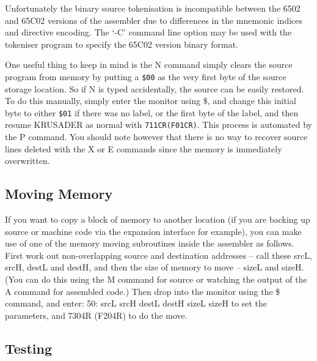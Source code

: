 \documentclass[12pt]{article}
\newcommand{\replica}[1]{\textsf{#1}}
\newcommand{\krusader}{\textsf{KRUSADER}\xspace}
\begin{document}
Unfortunately the binary source tokenisation is incompatible between the 6502 and 65C02 versions of the
assembler due to differences in the mnemonic indices and directive encoding. The `-C’ command line option
may be used with the tokeniser program to specify the 65C02 version binary format.

One useful thing to keep in mind is the \replica{N} command simply clears the source program
from memory by putting a \texttt{\$00} as the very first byte of the source storage location.
So if \replica{N} is typed accidentally, the source can be easily restored.  To do this manually, simply enter
the monitor using \replica{\$}, and change this initial byte to either \texttt{\$01} if there was no
label, or the first byte of the label, and then resume \krusader as normal with \texttt{711CR(F01CR)}.
This process is automated by the \replica{P} command.
You should note however that there is no way to recover source lines deleted with the
\replica{X} or \replica{E} commands since the memory is immediately overwritten.

\subsection{Moving Memory}

If you want to copy a block of memory to another location (if you are backing up source 
or machine code via the expansion interface for example), you can make use of one
of the memory moving subroutines inside the assembler as follows.  First work out non-overlapping source
and destination addresses -- call these \replica{srcL, srcH, destL} and \replica{destH}, and then
the size of memory to move -- \replica{sizeL} and \replica{sizeH}.  
(You can do this using the \replica{M} command for 
source or watching the output of the \replica{A} command for assembled code.)  Then drop into the 
monitor using the \replica{\$} command, and enter:
\replica{50: srcL srcH destL destH sizeL sizeH}
to set the parameters, and \replica{7304R} (\replica{F204R}) to do the move.

\subsection{Testing}
\end{document}
